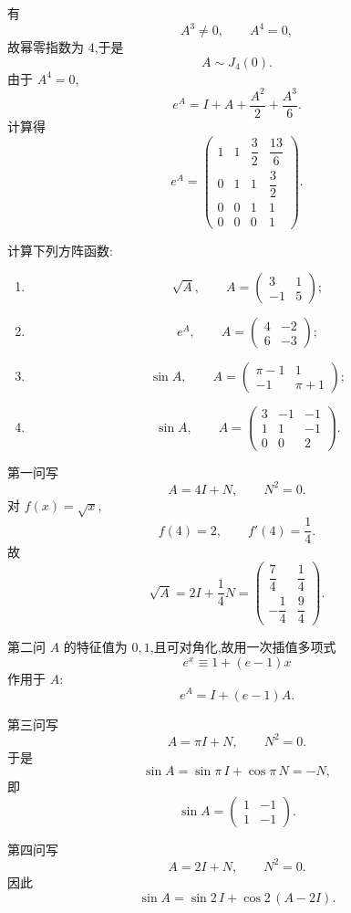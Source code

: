\begin{solution}
有
\[
A^3\neq0,\qquad A^4=0,
\]
故幂零指数为 $4$,于是
\[
\boxed{A\sim J_4(0)}.
\]
由于 $A^4=0$,
\[
e^A
=
I+A+\dfrac{A^2}{2}+\dfrac{A^3}{6}.
\]
计算得
\[
\boxed{
e^A=
\begin{pmatrix}
1&1&\dfrac32&\dfrac{13}{6}\\
0&1&1&\dfrac32\\
0&0&1&1\\
0&0&0&1
\end{pmatrix}.
}
\]
\end{solution}


\begin{example}
计算下列方阵函数:
\begin{enumerate}
    \item
    \[
    \sqrt A,\qquad
    A=
    \begin{pmatrix}
    3&1\\
    -1&5
    \end{pmatrix};
    \]
    \item
    \[
    e^A,\qquad
    A=
    \begin{pmatrix}
    4&-2\\
    6&-3
    \end{pmatrix};
    \]
    \item
    \[
    \sin A,\qquad
    A=
    \begin{pmatrix}
    \pi-1&1\\
    -1&\pi+1
    \end{pmatrix};
    \]
    \item
    \[
    \sin A,\qquad
    A=
    \begin{pmatrix}
    3&-1&-1\\
    1&1&-1\\
    0&0&2
    \end{pmatrix}.
    \]
\end{enumerate}
\end{example}
\exampleblank

\begin{solution}
第一问写
\[
A=4I+N,
\qquad
N^2=0.
\]
对 $f(x)=\sqrt x$,
\[
f(4)=2,\qquad f'(4)=\dfrac14.
\]
故
\[
\boxed{
\sqrt A
=
2I+\dfrac14N
=
\begin{pmatrix}
\dfrac74&\dfrac14\\[2mm]
-\dfrac14&\dfrac94
\end{pmatrix}.
}
\]

第二问 $A$ 的特征值为 $0,1$,且可对角化,故用一次插值多项式
\[
e^x\equiv1+(e-1)x
\]
作用于 $A$:
\[
\boxed{
e^A=I+(e-1)A.
}
\]

第三问写
\[
A=\pi I+N,
\qquad N^2=0.
\]
于是
\[
\sin A
=
\sin\pi\,I+\cos\pi\,N
=
-N,
\]
即
\[
\boxed{
\sin A=
\begin{pmatrix}
1&-1\\
1&-1
\end{pmatrix}.
}
\]

第四问写
\[
A=2I+N,
\qquad N^2=0.
\]
因此
\[
\boxed{
\sin A
=
\sin2\,I+\cos2\,(A-2I).
}
\]
\end{solution}


